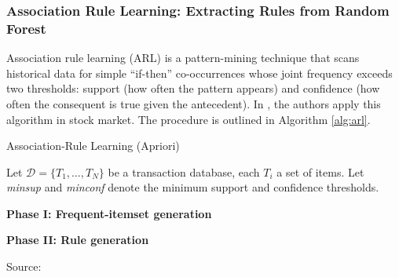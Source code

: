 

\subsubsection{Association Rule Learning: Extracting Rules from Random Forest}
Association rule learning (ARL) is a pattern-mining technique that scans historical data for simple “if-then” co-occurrences whose joint frequency exceeds two thresholds: support (how often the pattern appears) and confidence (how often the consequent is true given the antecedent). In , the authors apply this algorithm in stock market. The procedure is outlined in Algorithm \ref{alg:arl}.

\begin{algorithm}[H]
    \caption{Association-Rule Learning (Apriori)}
    \label{alg:arl_apriori}

    Let $\mathcal{D} = \{T_1,\ldots,T_N\}$ be a transaction database, each
    $T_i$ a set of items.  
    Let \textit{minsup} and \textit{minconf} denote the minimum support and confidence thresholds.

    \textbf{Phase I: Frequent-itemset generation}


    \vspace{4pt}
    \textbf{Phase II: Rule generation}


    Source: \cite{agrawal_1993}
\end{algorithm}


